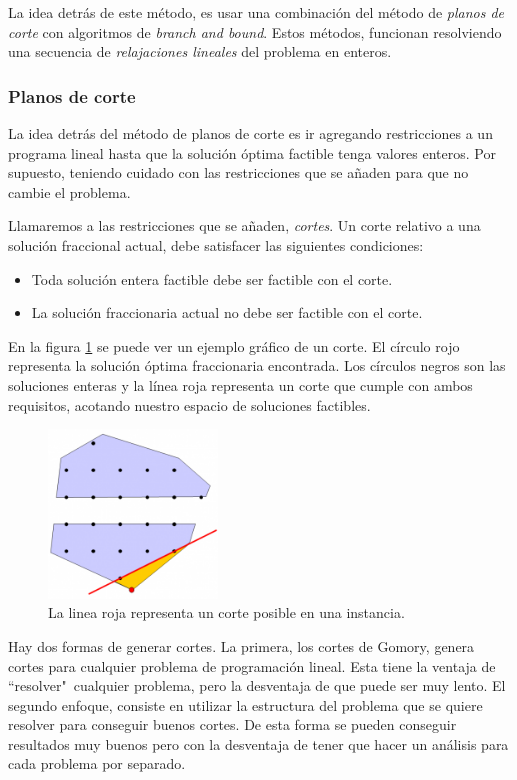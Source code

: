 \documentclass[10pt, a4paper]{article}
\theoremstyle{definition}
\begin{document}
La idea detrás de este método, es usar una combinación del método de \textit{planos de corte} con algoritmos de \textit{branch and bound}. Estos métodos, funcionan resolviendo una secuencia de \textit{relajaciones lineales} del problema en enteros.

\subsubsection{Planos de corte}
La idea detrás del método de planos de corte es ir agregando restricciones a un programa lineal hasta que la solución óptima factible tenga valores enteros. Por supuesto, teniendo cuidado con las restricciones que se añaden para que no cambie el problema.

Llamaremos a las restricciones que se añaden, \textit{cortes}. Un corte relativo a una solución fraccional actual, debe satisfacer las siguientes condiciones:
\begin{itemize}
  \item Toda solución entera factible debe ser factible con el corte.
  \item La solución fraccionaria actual no debe ser factible con el corte.
\end{itemize}

En la figura \ref{fig:ejemplo_cut} se puede ver un ejemplo gráfico de un corte. El círculo rojo representa la solución óptima fraccionaria encontrada. Los círculos negros son las soluciones enteras y la línea roja representa un corte que cumple con ambos requisitos, acotando nuestro espacio de soluciones factibles.
\begin{figure}[H]
  \centering
  \includegraphics[width=0.4\textwidth]{ejemplo_cut.png}
  \caption{La linea roja representa un corte posible en una instancia.}
  \label{fig:ejemplo_cut}
\end{figure}

Hay dos formas de generar cortes. La primera, los cortes de Gomory, genera cortes para cualquier problema de programación lineal. Esta tiene la ventaja de “resolver"\ cualquier problema, pero la desventaja de que puede ser muy lento. El segundo enfoque, consiste en utilizar la estructura del problema que se quiere resolver para conseguir buenos cortes. De esta forma se pueden conseguir resultados muy buenos pero con la desventaja de tener que hacer un análisis para cada problema por separado.
\end{document}
